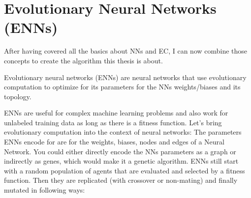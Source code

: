 \documentclass[11pt]{report}
\newcommand{\mydeflabel}{}
\newenvironment{mydef}[1]
{\renewcommand\mydeflabel{#1}\begin{mydefinner}}
{\end{mydefinner}}
\begin{document}
    \section{Evolutionary Neural Networks (ENNs)}\label{sec:evolutionary-neural-networks-(enns)}
    After having covered all the basics about NNs and EC, I can now combine those concepts to create the algorithm this thesis is about.
    \begin{mydef}{Evolutionary Neural Networks}
        Evolutionary neural networks (ENNs) are neural networks that use evolutionary computation to optimize for its parameters for the NNs weights/biases and its topology.
    \end{mydef}
    ENNs are useful for complex machine learning problems and also work for unlabeled training data as long as there is a fitness function.
    Let's bring evolutionary computation into the context of neural networks:
    The parameters ENNs encode for are for the weights, biases, nodes and edges of a Neural Network.
    You could either directly encode the NNs parameters as a graph or indirectly as genes, which would make it a genetic algorithm.
    ENNs still start with a random population of agents that are evaluated and selected by a fitness function.
    Then they are replicated (with crossover or non-mating) and finally mutated in following ways:
\end{document}

